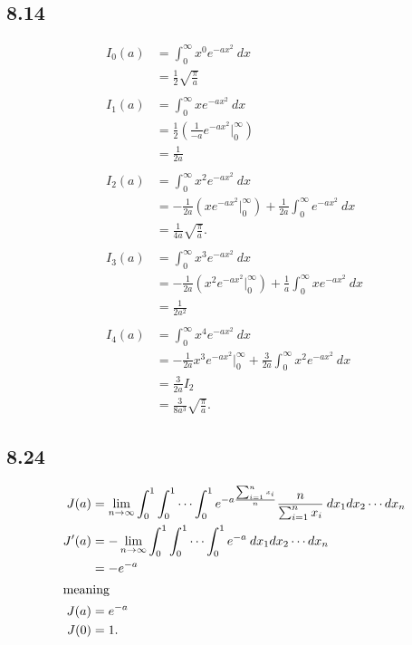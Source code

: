 \documentclass[10pt]{mypackage}
\begin{document}
\subsection{8.14}%
\begin{align*}
  I_0\left(a\right) &= \int_{0}^{\infty} x^{0}e^{-ax^2}\:dx\\
                    &= \frac{1}{2}\sqrt{\frac{\pi}{a}}\\
                    \\
  I_1\left(a\right) &= \int_{0}^{\infty} xe^{-ax^2}\:dx\\
                    &= \frac{1}{2}\left(\frac{1}{-a}e^{-ax^2}\bigr\vert_{0}^{\infty}\right)\\
                    &= \frac{1}{2a}\\
                    \\
  I_2\left(a\right) &= \int_{0}^{\infty} x^2e^{-ax^2}\:dx\\
                    &= -\frac{1}{2a}\left(xe^{-ax^2}\bigr\vert_{0}^{\infty}\right) + \frac{1}{2a}\int_{0}^{\infty} e^{-ax^2}\:dx\\
                    &= \frac{1}{4a}\sqrt{\frac{\pi}{a}}.\\
                    \\
  I_3\left(a\right) &= \int_{0}^{\infty} x^3e^{-ax^2}\:dx\\
                    &= -\frac{1}{2a}\left(x^2e^{-ax^2}\bigr\vert_{0}^{\infty}\right) + \frac{1}{a}\int_{0}^{\infty} xe^{-ax^2}\:dx\\
                    &= \frac{1}{2a^2}\\
                    \\
  I_4\left(a\right) &= \int_{0}^{\infty} x^4e^{-ax^2}\:dx\\
                    &= -\frac{1}{2a}x^3e^{-ax^2}\bigr\vert_{0}^{\infty} + \frac{3}{2a}\int_{0}^{\infty} x^2e^{-ax^2}\:dx\\
                    &= \frac{3}{2a}I_2\\
                    &= \frac{3}{8a^3}\sqrt{\frac{\pi}{a}}.
\end{align*}
\subsection{8.24}%
\begin{align*}
  J(a) &= \lim_{n\rightarrow\infty}\int_{0}^{1}\int_{0}^{1}\cdots\int_{0}^{1} e^{-a\frac{\sum_{i=1}^{n}x_i}{n}}\frac{n}{\sum_{i=1}^{n}x_i}\:dx_1dx_2\cdots dx_{n}\\
  J'(a) &= -\lim_{n\rightarrow\infty}\int_{0}^{1}\int_{0}^{1}\cdots\int_{0}^{1}e^{-a}\:dx_1dx_2\cdots dx_n\\
        &= -e^{-a}\\
        \intertext{meaning}
  J(a) &= e^{-a}\\
  J(0) &= 1.
\end{align*}
\end{document}
